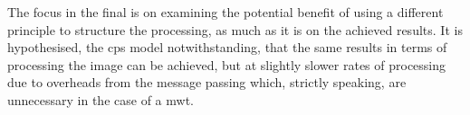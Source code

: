 The focus in the final  is on examining the potential benefit of using a different principle to structure the processing, as much as it is on the achieved results.  It is hypothesised, the \gls{cps} model notwithstanding, that the same results in terms of processing the image can be achieved, but at slightly slower rates of processing due to overheads from the message passing which, strictly speaking, are unnecessary in the case of a \gls{mwt}.